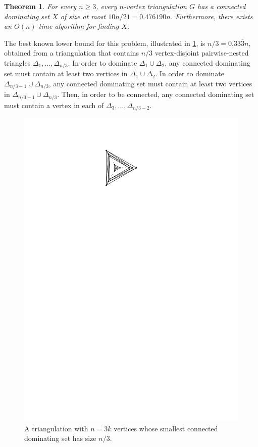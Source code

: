 \documentclass{article}
\newtheorem{thm}{Theorem}
\theoremstyle{definition}
\begin{document}
\begin{thm}\label{main_result2}
  For every $n\ge 3$, every $n$-vertex triangulation $G$ has a connected dominating set $X$ of size at most $10n/21= 0.\overline{476190}n$.  Furthermore, there exists an $O(n)$ time algorithm for finding $X$.
\end{thm}

The best known lower bound for this problem, illustrated in \cref{lower_bound}, is $n/3 = 0.33\overline{3} n$, obtained from a triangulation that contains $n/3$ vertex-disjoint pairwise-nested triangles $\Delta_1,\ldots,\Delta_{n/3}$.  In order to dominate $\Delta_1\cup \Delta_2$, any connected dominating set must contain at least two vertices in $\Delta_1 \cup \Delta_2$. In order to dominate $\Delta_{n/3-1}\cup \Delta_{n/3}$, any connected dominating set must contain at least two vertices in $\Delta_{n/3-1}\cup\Delta_{n/3}$.  Then, in order to be connected, any connected dominating set must contain a vertex in each of $\Delta_3,\ldots,\Delta_{n/3-2}$.

\begin{figure}[htbp]
  \centering
  \includegraphics{figs/nover3}
  \caption{A triangulation with $n=3k$ vertices whose smallest connected dominating set has size $n/3$.}
  \label{lower_bound}
\end{figure}
\end{document}
